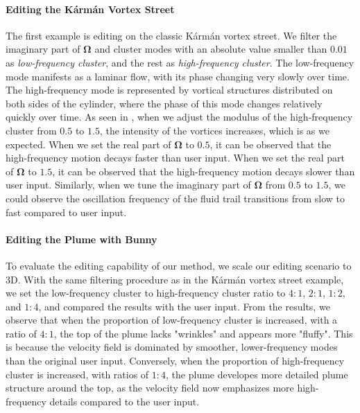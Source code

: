 \paragraph{Editing the K\'arm\'an Vortex Street}
The first example is editing on the classic K\'arm\'an vortex street. We filter the imaginary part of $\bm{\Omega}$ and cluster modes with an absolute value smaller than $0.01$ as \emph{low-frequency cluster}, and the rest as \emph{high-frequency cluster}.
The low-frequency mode manifests as a laminar flow, with its phase changing very slowly over time. The high-frequency mode is represented by vortical structures distributed on both sides of the cylinder, where the phase of this mode changes relatively quickly over time.
As seen in , when we adjust the modulus of the high-frequency cluster from $0.5$ to $1.5$, the intensity of the vortices increases, which is as we expected. When we set the real part of $\bm{\Omega}$ to $0.5$, it can be observed that the high-frequency motion decays faster than user input. When we set the real part of $\bm{\Omega}$ to $1.5$, it can be observed that the high-frequency motion decays slower than user input. Similarly, when we tune the imaginary part of $\bm{\Omega}$ from $0.5$ to $1.5$, we could observe the oscillation frequency of the fluid trail transitions from slow to fast compared to user input.
\paragraph{Editing the Plume with Bunny}
To evaluate the editing capability of our method, we scale our editing scenario to 3D. With the same filtering procedure as in the K\'arm\'an vortex street example, we set the low-frequency cluster to high-frequency cluster ratio to $4:1$, $2:1$, $1:2$, and $1:4$, and compared the results with the user input. From the results, we observe that when the proportion of low-frequency cluster is increased, with a ratio of $4:1$, the top of the plume lacks "wrinkles" and appears more "fluffy". This is because the velocity field is dominated by smoother, lower-frequency modes than the original user input. Conversely, when the proportion of high-frequency cluster is increased, with ratios of $1:4$, the plume developes more detailed plume structure around the top, as the velocity field now emphasizes more high-frequency details compared to the user input.

